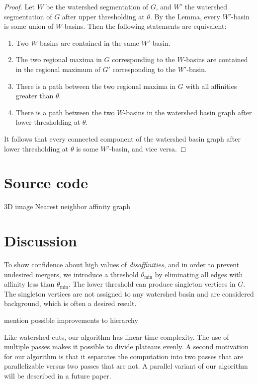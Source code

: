 \documentclass{article}
\begin{document}
\begin{proof}
Let $W$ be the watershed segmentation of $G$, and $W'$ the watershed
segmentation of $G$ after upper thresholding at $\theta$.  By the
Lemma, every $W'$-basin is some union of $W$-basins.  Then the
following statements are equivalent:
\begin{enumerate}
\item Two $W$-basins are contained in the same $W'$-basin.
\item The two regional maxima in $G$ corresponding to the $W$-basins
  are contained in the regional maximum of $G'$ corresponding to the
  $W'$-basin.
\item There is a path between the two regional maxima in $G$ with
  all affinities greater than $\theta$.
\item There is a path between the two $W$-basins in the watershed
  basin graph after lower thresholding at $\theta$.
\end{enumerate}
It follows that every connected component of the watershed basin graph
after lower thresholding at $\theta$ is some $W'$-basin, and vice versa.
\end{proof}

\section{Source code}
3D image
Nearest neighbor affinity graph

\section{Discussion}
To show confidence about high values of \emph{disaffinities}, and in
order to prevent undesired mergers, we introduce a threshold
$\theta_{\min}$ by eliminating all edges with affinity less than
$\theta_{\min}$. The lower threshold can produce singleton vertices in
$G$. The singleton vertices are not assigned to any watershed basin
and are considered background, which is often a desired result.

mention possible improvements to hierarchy

Like watershed cuts, our algorithm has linear time complexity.  The
use of multiple passes makes it possible to divide plateaus evenly.  A
second motivation for our algorithm is that it separates the
computation into two passes that are parallelizable versus two passes
that are not.  A parallel variant of our algorithm will be described
in a future paper.





{\small


}
\end{document}
